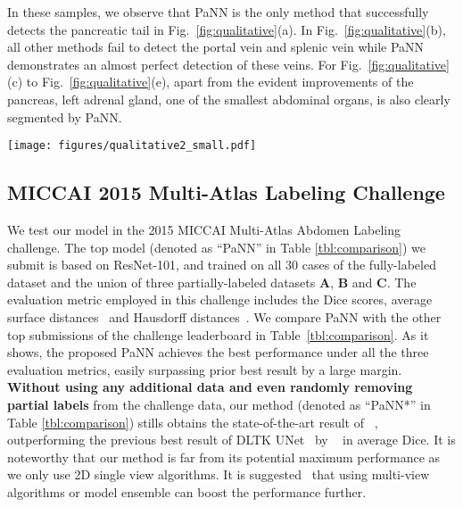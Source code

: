 \documentclass[10pt,twocolumn,letterpaper]{article}
\begin{document}
In these samples, we observe that PaNN is the only method that successfully detects the pancreatic tail in Fig.~\ref{fig:qualitative}(a). In Fig.~\ref{fig:qualitative}(b), all other methods fail to detect the portal vein and splenic vein while PaNN demonstrates an almost perfect detection of these veins. For Fig.~\ref{fig:qualitative}(c) to Fig.~\ref{fig:qualitative}(e), apart from the evident improvements of the pancreas, left adrenal gland, one of the smallest abdominal organs, is also clearly segmented by PaNN.

\begin{figure*}[tb]
    \vspace{-1em}
 	\centering
 	\texttt{[image: figures/qualitative2\_small.pdf]}
 	\caption{Qualitative comparison of different methods, where the partially-labeled dataset \textbf{C} is used as partial supervision with ResNet-101 as the backbone model. We exhibit 3 cases (5 slices) as examples. Improved segmentation regions are zoomed in from the axial view to demonstrate finer details. 
}
 	\label{fig:qualitative}
 	\vspace{-1em}
\end{figure*}

\subsection{MICCAI 2015 Multi-Atlas Labeling Challenge}
We test our model in the 2015 MICCAI Multi-Atlas Abdomen Labeling challenge. The top model (denoted as ``PaNN'' in Table \ref{tbl:comparison}) we submit is based on ResNet-101, and trained on all 30 cases of the fully-labeled dataset  and the union of three partially-labeled datasets \textbf{A}, \textbf{B} and \textbf{C}. The evaluation metric employed in this challenge includes the Dice scores, average surface distances~\cite{roth2018spatial} and Hausdorff distances~\cite{milletari2016v}. We compare PaNN with the other top submissions of the challenge leaderboard in Table~\ref{tbl:comparison}. As it shows, the proposed PaNN achieves the best performance under all the three evaluation metrics, easily surpassing prior best result by a large margin. \textbf{Without using any additional data and even randomly removing partial labels} from the challenge data, our method (denoted as ``PaNN*'' in Table \ref{tbl:comparison}) stills obtains the state-of-the-art result of ~, outperforming the previous best result of DLTK UNet~\cite{pawlowski2017dltk} by ~ in average Dice. It is noteworthy that our method is far from its potential maximum performance as we only use 2D single view algorithms. It is suggested~\cite{zhou2017fixed, wang2018abdominal,zhou2019semi} that using multi-view algorithms or model ensemble can boost the performance further.
\end{document}
